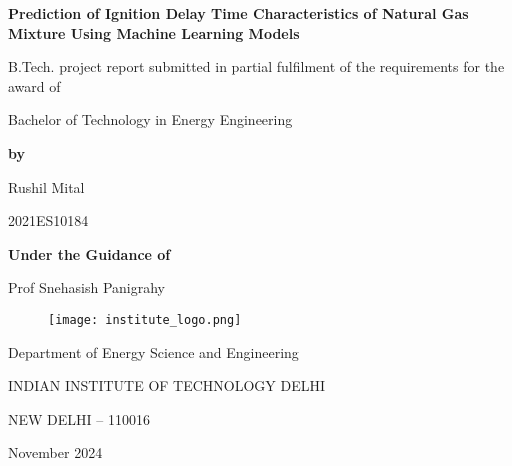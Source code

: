 \documentclass[12pt]{report}
\begin{document}
\begin{titlepage}
    \centering

    {\Huge \textbf{Prediction of Ignition Delay Time Characteristics of Natural Gas Mixture Using Machine Learning Models}\par}
    \vspace{1cm} %
    
    {\Large B.Tech. project report submitted in partial fulfilment of the requirements for the award of}\par
    
    {\Large Bachelor of Technology in Energy Engineering}\par
    
    \vspace{1cm}
    
    \textbf{by}\par
    {\Large Rushil Mital}\par
    \vspace{0.5cm}
    {\Large 2021ES10184}\par
    
    \vspace{0.5cm} %
    
    \textbf{Under the Guidance of}\par
    {\Large Prof Snehasish Panigrahy}\par
    
    \vspace{0.5cm} %

    \begin{figure}[H]
        \centering
        \texttt{[image: institute\_logo.png]} %
    \end{figure}
    
    {\Large Department of Energy Science and Engineering}\par
    \vspace{0.25cm}
    {\Large INDIAN INSTITUTE OF TECHNOLOGY DELHI}\par
    \vspace{0.25cm}
    {\Large NEW DELHI – 110016}\par
    {\Large November 2024}\par

\end{titlepage}
\end{document}
